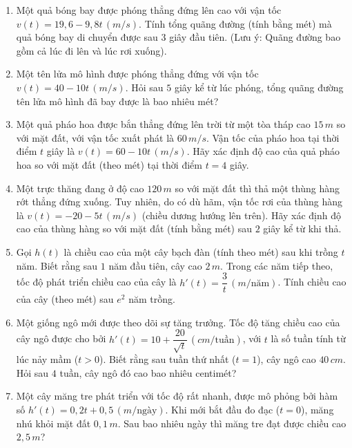 \documentclass[12pt]{article}
\begin{document}
\begin{enumerate}[label=\textbf{Câu \arabic*.}, start=1]
		\item Một quả bóng bay được phóng thẳng đứng lên cao với vận tốc $v(t) = 19,6 - 9,8t \, (m/s)$. Tính tổng quãng đường (tính bằng mét) mà quả bóng bay di chuyển được sau $3$ giây đầu tiên. (Lưu ý: Quãng đường bao gồm cả lúc đi lên và lúc rơi xuống).
		\vspace{0.75cm}
		
		\item Một tên lửa mô hình được phóng thẳng đứng với vận tốc $v(t) = 40 - 10t \, (m/s)$. Hỏi sau $5$ giây kể từ lúc phóng, tổng quãng đường tên lửa mô hình đã bay được là bao nhiêu mét?
		\vspace{0.75cm}
		
		\item Một quả pháo hoa được bắn thẳng đứng lên trời từ một tòa tháp cao $15 \, m$ so với mặt đất, với vận tốc xuất phát là $60 \, m/s$. Vận tốc của pháo hoa tại thời điểm $t$ giây là $v(t) = 60 - 10t \, (m/s)$. Hãy xác định độ cao của quả pháo hoa so với mặt đất (theo mét) tại thời điểm $t = 4$ giây.
		\vspace{0.75cm}
		
		\item Một trực thăng đang ở độ cao $120 \, m$ so với mặt đất thì thả một thùng hàng rớt thẳng đứng xuống. Tuy nhiên, do có dù hãm, vận tốc rơi của thùng hàng là $v(t) = -20 - 5t \, (m/s)$ (chiều dương hướng lên trên). Hãy xác định độ cao của thùng hàng so với mặt đất (tính bằng mét) sau $2$ giây kể từ khi thả.
		\vspace{0.75cm}
		
		\item Gọi $h(t)$ là chiều cao của một cây bạch đàn (tính theo mét) sau khi trồng $t$ năm. Biết rằng sau $1$ năm đầu tiên, cây cao $2 \, m$. Trong các năm tiếp theo, tốc độ phát triển chiều cao của cây là $h'(t) = \dfrac{3}{t} \, (m/\text{năm})$. Tính chiều cao của cây (theo mét) sau $e^2$ năm trồng.
		\vspace{0.75cm}
		
		\item Một giống ngô mới được theo dõi sự tăng trưởng. Tốc độ tăng chiều cao của cây ngô được cho bởi $h'(t) = 10 + \dfrac{20}{\sqrt{t}} \, (cm/\text{tuần})$, với $t$ là số tuần tính từ lúc nảy mầm ($t > 0$). Biết rằng sau tuần thứ nhất ($t=1$), cây ngô cao $40 \, cm$. Hỏi sau $4$ tuần, cây ngô đó cao bao nhiêu centimét?
		\vspace{0.75cm}
		
		\item Một cây măng tre phát triển với tốc độ rất nhanh, được mô phỏng bởi hàm số $h'(t) = 0,2t + 0,5 \, (m/\text{ngày})$. Khi mới bắt đầu đo đạc ($t=0$), măng nhú khỏi mặt đất $0,1 \, m$. Sau bao nhiêu ngày thì măng tre đạt được chiều cao $2,5 \, m$?
		\vspace{0.75cm}
		

\end{enumerate}
\end{document}
